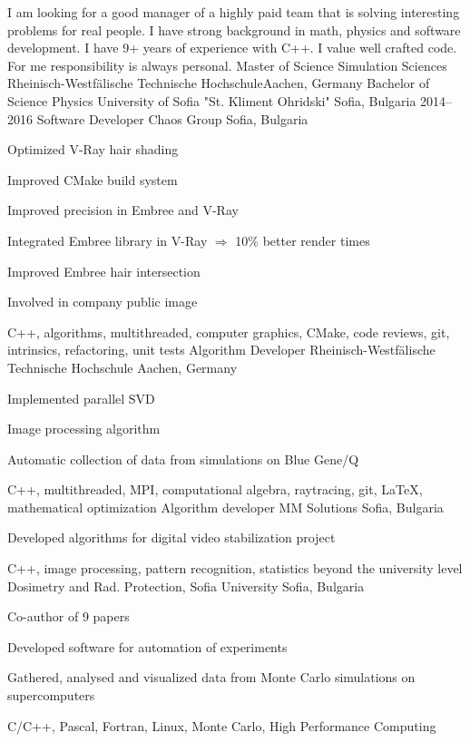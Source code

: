 I am looking for a good manager of a highly paid team that is solving
interesting problems for real people. I have strong background in math, physics
and software development. I have 9+ years of experience with C++. I value well
crafted code. For me responsibility is always personal.
{Master of Science}
{Simulation Sciences}
{Rheinisch-Westfälische Technische Hochschule}{Aachen, Germany}
{Bachelor of Science}
{Physics}
{University of Sofia "St. Kliment Ohridski"}
{Sofia, Bulgaria}
\myjobb
{2014--2016}
{Software Developer}
{Chaos Group}
{Sofia, Bulgaria}
{
\item Optimized V-Ray hair shading
\item Improved CMake build system 
\item Improved precision in Embree and V-Ray
}
{
\item Integrated Embree library in V-Ray $\Rightarrow$ 10\% better render times 
\item Improved Embree hair intersection 
\item Involved in company public image
}
{C++, algorithms, multithreaded, computer graphics, CMake, code reviews, git, intrinsics, refactoring, unit tests}
{Algorithm Developer}
{Rheinisch-Westfälische Technische Hochschule}
{Aachen, Germany}
{
 \item Implemented parallel SVD
 \item Image processing algorithm
}
{
\item Automatic collection of data from simulations on Blue Gene/Q
}
{C++, multithreaded, MPI, computational algebra, raytracing, git, \LaTeX, mathematical optimization}
{Algorithm developer}
{MM Solutions}
{Sofia, Bulgaria}
{ \item Developed algorithms for digital video stabilization project}
{C++, image processing, pattern recognition, statistics beyond the university level}
{Dosimetry and Rad. Protection, Sofia University} {Sofia, Bulgaria}
{
 \item Co-author of 9 papers
 \item Developed software for automation of experiments
}
{ 
 \item Gathered, analysed and visualized data from Monte Carlo simulations on supercomputers
}
{C/C++, Pascal, Fortran, Linux, Monte Carlo, High Performance Computing}
